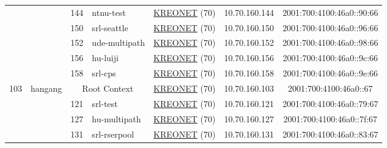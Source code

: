 \begin{small}
\begin{center}
\begin{longtable}{|c|c|c|c|c|c|c|c|}
  &  & \tiny{144} & \multicolumn{1}{|l|}{\tiny{ntnu-test}} & \multicolumn{2}{|c|}{\tiny{\href{http://www.kreonet.net}{KREONET} (70)}} & \tiny{10.70.160.144} & \tiny{2001:700:4100:46a0::90:66} \\* \cline{3-3}\cline{4-4}\cline{5-5}\cline{6-6}\cline{7-7}\cline{8-8}
  &  & \tiny{150} & \multicolumn{1}{|l|}{\tiny{srl-seattle}} & \multicolumn{2}{|c|}{\tiny{\href{http://www.kreonet.net}{KREONET} (70)}} & \tiny{10.70.160.150} & \tiny{2001:700:4100:46a0::96:66} \\* \cline{3-3}\cline{4-4}\cline{5-5}\cline{6-6}\cline{7-7}\cline{8-8}
  &  & \tiny{152} & \multicolumn{1}{|l|}{\tiny{ude-multipath}} & \multicolumn{2}{|c|}{\tiny{\href{http://www.kreonet.net}{KREONET} (70)}} & \tiny{10.70.160.152} & \tiny{2001:700:4100:46a0::98:66} \\* \cline{3-3}\cline{4-4}\cline{5-5}\cline{6-6}\cline{7-7}\cline{8-8}
  &  & \tiny{156} & \multicolumn{1}{|l|}{\tiny{hu-luiji}} & \multicolumn{2}{|c|}{\tiny{\href{http://www.kreonet.net}{KREONET} (70)}} & \tiny{10.70.160.156} & \tiny{2001:700:4100:46a0::9c:66} \\* \cline{3-3}\cline{4-4}\cline{5-5}\cline{6-6}\cline{7-7}\cline{8-8}
  &  & \tiny{158} & \multicolumn{1}{|l|}{\tiny{srl-cps}} & \multicolumn{2}{|c|}{\tiny{\href{http://www.kreonet.net}{KREONET} (70)}} & \tiny{10.70.160.158} & \tiny{2001:700:4100:46a0::9e:66} \\ \hline
 \multirow{9}{*}{\tiny{103}} & \multicolumn{1}{|l|}{\multirow{9}{*}{\tiny{hangang}}} & \multicolumn{2}{|c|}{\tiny{Root Context}} & \multicolumn{2}{|c|}{\tiny{\href{http://www.kreonet.net}{KREONET} (70)}} & \tiny{10.70.160.103} & \tiny{2001:700:4100:46a0::67} \\* \cline{3-3}\cline{4-4}\cline{5-5}\cline{6-6}\cline{7-7}\cline{8-8}
  &  & \tiny{121} & \multicolumn{1}{|l|}{\tiny{srl-test}} & \multicolumn{2}{|c|}{\tiny{\href{http://www.kreonet.net}{KREONET} (70)}} & \tiny{10.70.160.121} & \tiny{2001:700:4100:46a0::79:67} \\* \cline{3-3}\cline{4-4}\cline{5-5}\cline{6-6}\cline{7-7}\cline{8-8}
  &  & \tiny{127} & \multicolumn{1}{|l|}{\tiny{hu-multipath}} & \multicolumn{2}{|c|}{\tiny{\href{http://www.kreonet.net}{KREONET} (70)}} & \tiny{10.70.160.127} & \tiny{2001:700:4100:46a0::7f:67} \\* \cline{3-3}\cline{4-4}\cline{5-5}\cline{6-6}\cline{7-7}\cline{8-8}
  &  & \tiny{131} & \multicolumn{1}{|l|}{\tiny{srl-rserpool}} & \multicolumn{2}{|c|}{\tiny{\href{http://www.kreonet.net}{KREONET} (70)}} & \tiny{10.70.160.131} & \tiny{2001:700:4100:46a0::83:67} \\* \cline{3-3}\cline{4-4}\cline{5-5}\cline{6-6}\cline{7-7}\cline{8-8}

\end{longtable}
\end{center}
\end{small}
